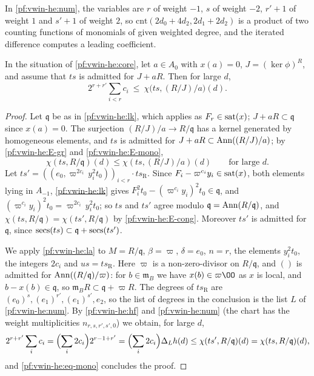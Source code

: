 In \cref{pf:vwin-he:num}, the variables are $r$ of weight $-1$, $s$ of weight $-2$, $r'+1$ of weight $1$ and $s'+1$ of
weight $2$, so $\mathrm{cnt}(2d_0+4d_2,2d_1+2d_2)$ is a product of two counting functions of monomials of given
weighted degree, and the iterated difference computes a leading coefficient.

\begin{proposition}\label{pf:vwin-he:low}
In the situation of \cref{pf:vwin-he:core}, let $a\in A_0$ with $x(a)=0$, $J=(\ker\phi)^R$, and assume that $ts$ is
admitted for $J+aR$. Then for large $d$,
\[
 2^{r+r'}\sum_{i<r}c_i\ \le\ \chi\bigl(ts,(R/J)/a\bigr)(d).
\]
\end{proposition}

\begin{proof}
Let $\mathfrak q$ be as in \cref{pf:vwin-he:lk}, which applies as $F_r\in\operatorname{sat}(x)$; $J+aR\subset\mathfrak q$ since
$x(a)=0$. The surjection $(R/J)/a\to R/\mathfrak q$ has a kernel generated by homogeneous elements, and $ts$ is
admitted for $J+aR\subset\operatorname{Ann}((R/J)/a)$; by \ref{pf:vwin-he:E-gr} and \ref{pf:vwin-he:E-mono},
\begin{equation}\label{pf:vwin-he:eq-mono}
 \chi(ts,R/\mathfrak q)(d)\le\chi(ts,(R/J)/a)(d)\qquad\text{for large }d.
\end{equation}
Let $ts'=((e_0,\varpi^{2c_i}\,y_i^2t_0))_{i<r}\cdot ts_{\mathrm R}$. Since $F_i-\varpi^{c_i}y_i\in\operatorname{sat}(x)$, both
elements lying in $A_{-1}$, \cref{pf:vwin-he:lk} gives
$F_i^2t_0-(\varpi^{c_i}y_i)^2t_0\in\mathfrak q$, and $(\varpi^{c_i}y_i)^2t_0=\varpi^{2c_i}\,y_i^2t_0$; so $ts$ and $ts'$
agree modulo $\mathfrak q=\operatorname{Ann}(R/\mathfrak q)$, and $\chi(ts,R/\mathfrak q)=\chi(ts',R/\mathfrak q)$ by
\ref{pf:vwin-he:E-cong}. Moreover $ts'$ is admitted for $\mathfrak q$, since
$\operatorname{secs}(ts)\subset\mathfrak q+\operatorname{secs}(ts')$.

We apply \cref{pf:vwin-he:la} to $M=R/\mathfrak q$, $\beta=\varpi$, $\delta=e_0$,
$n=r$, the elements $y_i^2t_0$, the integers $2c_i$ and $us=ts_{\mathrm R}$. Here $\varpi$ is a non-zero-divisor on
$R/\mathfrak q$, and $()$ is admitted for $\operatorname{Ann}((R/\mathfrak q)/\varpi)$: for $b\in\mathfrak m_B$ we have
$x(b)\in\varpi\OO$ as $x$ is local, and $b-x(b)\in\mathfrak q$, so $\mathfrak m_BR\subset\mathfrak q+\varpi R$. The
degrees of $ts_{\mathrm R}$ are $(e_0)^s,(e_1)^{r'},(e_1)^{s'},e_2$, so the list of degrees in the conclusion is the
list $L$ of \cref{pf:vwin-he:num}. By \cref{pf:vwin-he:hf} and \cref{pf:vwin-he:num} (the chart has the weight
multiplicities $n_{r,s,r',s',0}$) we obtain, for large $d$,
\[
 2^{r+r'}\sum_ic_i=\Bigl(\sum_i2c_i\Bigr)2^{r-1+r'}=\Bigl(\sum_i2c_i\Bigr)\Delta_Lh(d)\le\chi(ts',R/\mathfrak q)(d)
 =\chi(ts,R/\mathfrak q)(d),
\]
and \eqref{pf:vwin-he:eq-mono} concludes the proof.
\end{proof}

